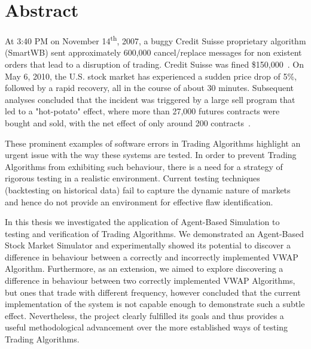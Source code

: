 \chapter*{Abstract}
At 3:40 PM on November 14\textsuperscript{th}, 2007, a buggy Credit Suisse proprietary algorithm (SmartWB) sent approximately 600,000 cancel/replace messages for non existent orders that lead to a disruption of trading. Credit Suisse was fined \$150,000~\cite{Nyse2009}. On May 6, 2010, the U.S. stock market has experienced a sudden price drop of 5\%, followed by a rapid recovery, all in the course of about 30 minutes. Subsequent analyses concluded that the incident was triggered by a large sell program that led to a "hot-potato" effect, where more than 27,000 futures contracts were bought and sold, with the net effect of only around 200 contracts~\cite{Kirilenko2011}.

These prominent examples of software errors in Trading Algorithms highlight an urgent issue with the way these systems are tested. In order to prevent Trading Algorithms from exhibiting such behaviour, there is a need for a strategy of rigorous testing in a realistic environment. Current testing techniques (backtesting on historical data) fail to capture the dynamic nature of markets and hence do not provide an environment for effective flaw identification. 

In this thesis we investigated the application of Agent-Based Simulation to testing and verification of Trading Algorithms. We demonstrated an Agent-Based Stock Market Simulator and experimentally showed its potential to discover a difference in behaviour between a correctly and incorrectly implemented VWAP Algorithm. Furthermore, as an extension, we aimed to explore discovering a difference in behaviour between two correctly implemented VWAP Algorithms, but ones that trade with different frequency, however concluded that the current implementation of the system is not capable enough to demonstrate such a subtle effect. Nevertheless, the project clearly fulfilled its goals and thus provides a useful methodological advancement over the more established ways of testing Trading Algorithms.
\vfill